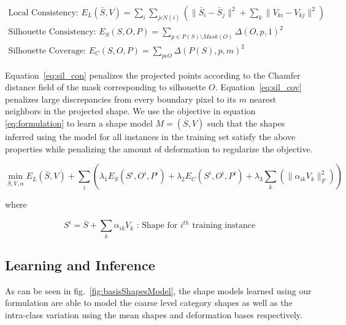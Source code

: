 \begin{gather}
 \label{eq:local_con}\text{Local Consistency: }E_{L}(\bar{S},V)=\underset{i}{\sum}\underset{j\epsilon N(i)}{\sum}(\|\bar{S}_{i}-\bar{S}_{j}\|^2 +\underset{k}{\sum}\|V_{ki}-V_{kj}\|^2) \\
 \label{eq:sil_con} \text{Silhouette Consistency: }E_{S}(S,O,P)=\underset{p \in P(S)\setminus Mask(O)}{\sum}\Delta(O,p,1)^{2}\\
  \label{eq:sil_cov}\text{Silhouette Coverage: }E_{C}(S,O,P)=\underset{p\epsilon O}{\sum}\Delta(P(S),p,m)^2
\end{gather}

Equation~\eqref{eq:sil_con} penalizes the projected points according to the Chamfer distance field of the mask corresponding to silhouette $O$. Equation~\eqref{eq:sil_cov} penalizes large discrepancies from every boundary pixel to its $m$ nearest neighbors in the projected shape.  We use the objective in equation \ref{eq:formulation} to learn a shape model $M = (\overline{S},V)$ such that the shapes inferred using the model for all instances in the training set satisfy the above properties while penalizing the amount of deformation to regularize the objective.

\begin{equation}
\label{eq:formulation}
\underset{\bar{S},V,\alpha}{\min} E_{L}(\bar{S},V)+\underset{i}{\sum}(\lambda_{1}E_{S}(S^{i},O^{i},P^{i})+\lambda_{2}E_{C}(S^{i},O^{i},P^{i})+\lambda_3\underset{k}{\sum}(\|\alpha_{ik}V_k\|_F^{2}))
\end{equation}

where 

\[
S^i = \overline{S} + \underset{k}{\sum}\alpha_{ik} V_k \text{  : Shape for }  i^{th} \text{ training instance}
\]

\subsection{Learning and Inference}
As can be seen in fig.~\ref{fig:basisShapesModel}, the shape models learned using our formulation are able to model the coarse level category shapes as well as the intra-class variation using the mean shapes and deformation bases respectively.

